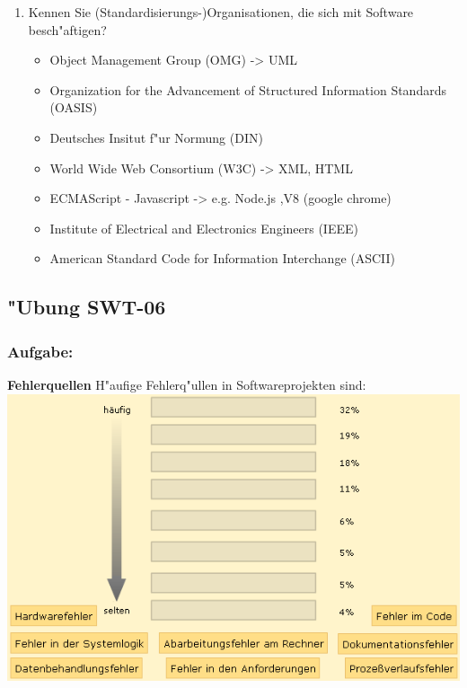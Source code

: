 \begin{enumerate}
\item Kennen Sie (Standardisierungs-)Organisationen, die sich mit Software besch"aftigen?


\begin{itemize}
  \item Object Management Group (OMG) -> UML
  \item Organization for the Advancement of Structured Information Standards (OASIS)
  \item Deutsches Insitut f"ur Normung (DIN)
  \item World Wide Web Consortium (W3C) -> XML, HTML
  \item ECMAScript - Javascript -> e.g. Node.js ,V8 (google chrome)
  \item Institute of Electrical and Electronics Engineers (IEEE)
  \item American Standard Code for Information Interchange (ASCII)
\end{itemize}

\end{enumerate}


\newpage
\subsection{"Ubung SWT-06}
\subsubsection*{Aufgabe:}

\begin{framed}
\textbf{Fehlerquellen}
\smallbreak
H"aufige Fehlerq"ullen in Softwareprojekten sind:
\bigbreak
\includegraphics[width=1.0\textwidth]{./images/ueb01-06.png}
\end{framed}
\bigbreak
\bigbreak
